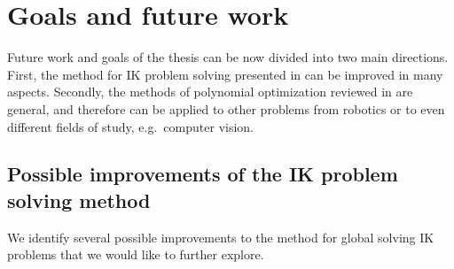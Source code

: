 \chapter{Goals and future work}
Future work and goals of the thesis can be now divided into two main directions.
First, the method for IK problem solving presented in  can be improved in many aspects.
Secondly, the methods of polynomial optimization reviewed in  are general, and therefore can be applied to other problems from robotics or to even different fields of study, e.g.\ computer vision.

\section{Possible improvements of the IK problem solving method}
We identify several possible improvements to the method for global solving IK problems that we would like to further explore.
